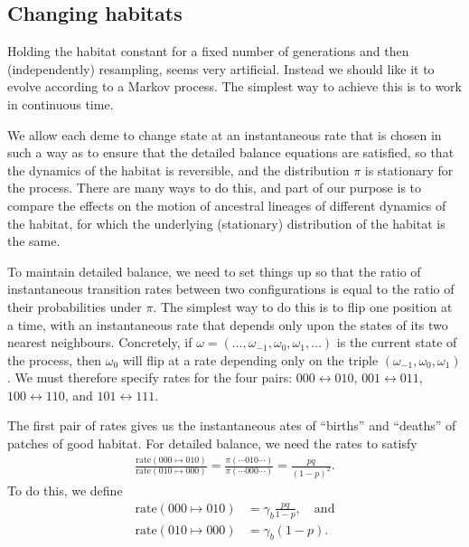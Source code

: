 \documentclass{article}
\newcommand{\rate}[2]{\text{rate}(#1\mapsto#2)}
\begin{document}
\subsection{Changing habitats}

Holding the habitat constant for a fixed number of generations and then (independently) resampling, 
seems very artificial. 
Instead we should like it to evolve according to a Markov process. 
The simplest way to achieve this is to work in continuous time.

We allow each deme to change state at an instantaneous rate that is chosen in such a way
as to ensure that the detailed balance equations are satisfied, 
so that the dynamics of the habitat is reversible, 
and the distribution $\pi$ is stationary for the process. 
There are many ways to do this,
and part of our purpose is to compare 
the effects on the motion of ancestral lineages of different dynamics of the habitat, 
for which the underlying (stationary) distribution of the habitat is the same.

To maintain detailed balance, we need to set things up so that
the ratio of instantaneous transition rates between two configurations
is equal to the ratio of their probabilities under $\pi$.
The simplest way to do this is to flip one position at a time,
with an instantaneous rate that depends only upon the states of its two nearest neighbours. 
Concretely, if $\omega = (\ldots, \omega_{-1}, \omega_0, \omega_1, \ldots)$
is the current state of the process, then $\omega_0$ will flip
at a rate depending only on the triple $(\omega_{-1}, \omega_0, \omega_1)$.
We must therefore specify rates for the four pairs: 
$000 \leftrightarrow 010$,
$001 \leftrightarrow 011$,
$100 \leftrightarrow 110$,
and $101 \leftrightarrow 111$.

The first pair of rates gives us the instantaneous ates of
 ``births'' and ``deaths'' of patches of good habitat.
For detailed balance, we need the rates to satisfy
\begin{align*}
    \frac{\rate{000}{010}}{\rate{010}{000}}
    =
    \frac{\pi(\cdots010\cdots)}{\pi(\cdots000\cdots)}
    =
    \frac{pq}{(1-p)^2} .
\end{align*}
To do this, we define
\begin{align}
    \rate{000}{010} &= \gamma_b \frac{pq}{1-p}, \quad \text{and}\\
    \rate{010}{000} &= \gamma_b (1-p) .
\end{align}
\end{document}
